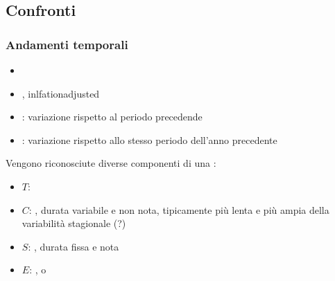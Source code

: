 \documentclass[letterpaper,10pt,italian]{jupyterBook}
\begin{document}
\subsection{Confronti}
\label{\detokenize{ch/macro:confronti}}\label{\detokenize{ch/macro:economics-hs-macro-intro-comparisons}}

\subsubsection{Andamenti temporali}
\label{\detokenize{ch/macro:andamenti-temporali}}\label{\detokenize{ch/macro:economics-hs-macro-intro-comparisons-time}}
\sphinxAtStartPar
{}
\begin{itemize}
\item {} 
\sphinxAtStartPar
{}

\item {} 
\sphinxAtStartPar
{}, inlfation\sphinxhyphen{}adjusted

\end{itemize}

\sphinxAtStartPar
{}
\begin{itemize}
\item {} 
\sphinxAtStartPar
{}: variazione rispetto al periodo precedende

\item {} 
\sphinxAtStartPar
{}: variazione rispetto allo stesso periodo dell’anno precedente

\end{itemize}

\sphinxAtStartPar
{} Vengono riconosciute diverse componenti di una :
\begin{itemize}
\item {} 
\sphinxAtStartPar
\(T\): 

\item {} 
\sphinxAtStartPar
\(C\): , durata variabile e non nota, tipicamente più lenta e più ampia della variabilità stagionale (?)

\item {} 
\sphinxAtStartPar
\(S\): , durata fissa e nota

\item {} 
\sphinxAtStartPar
\(E\): , o 

\end{itemize}
\end{document}

